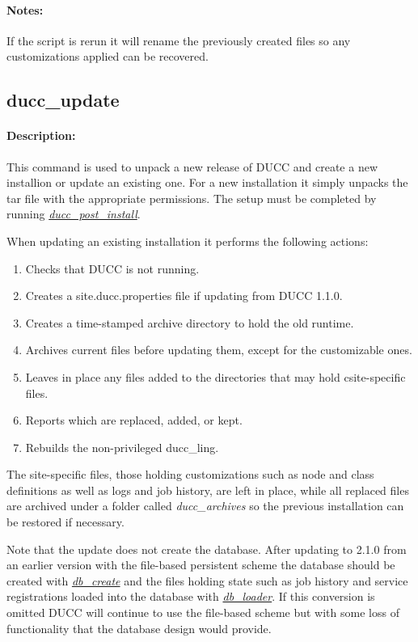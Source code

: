     \paragraph{Notes:}
    If the script is rerun it will rename the previously created files so any customizations applied
    can be recovered.

\subsection{ducc\_update}
\label{subsec:admin.ducc-update}

    \paragraph{Description:}
        This command is used to unpack a new release of DUCC and create a new installion or update
        an existing one.
        For a new installation it simply unpacks the tar file with the appropriate permissions.
        The setup must be completed by running \hyperref[subsec:admin.ducc-post-install]{\em ducc\_post\_install}.

        When updating an existing installation it performs the following actions:
        \begin{enumerate}
          \item Checks that DUCC is not running.
          \item Creates a site.ducc.properties file if updating from DUCC 1.1.0.
          \item Creates a time-stamped archive directory to hold the old runtime.
          \item Archives current files before updating them, except for the customizable ones.
          \item Leaves in place any files added to the directories that may hold csite-specific files.
          \item Reports which are replaced, added, or kept.
          \item Rebuilds the non-privileged ducc\_ling.
        \end{enumerate}

        The site-specific files, those holding customizations such as node and class definitions
        as well as logs and job history, are left in place, 
        while all replaced files are archived under a folder called {\em ducc\_archives} 
        so the previous installation can be restored if necessary.

        Note that the update does not create the database.  After updating to 2.1.0 from an earlier
        version with the file-based persistent scheme the database should be created with
        \hyperref[subsec:admin.db-create]{\em db\_create} 
        and the files holding state such as job history and service registrations loaded into the database with
        \hyperref[subsec:admin.db-loader]{\em db\_loader}.
        If this conversion is omitted DUCC will continue to use the file-based scheme but with some
        loss of functionality that the database design would provide.
        
